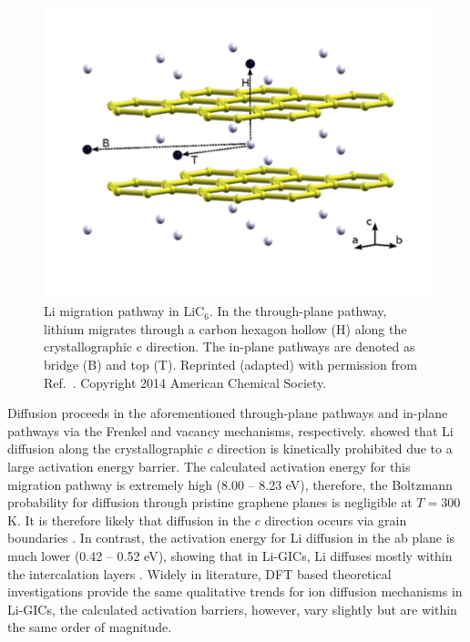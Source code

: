 \documentclass[../main.tex]{subfiles}
\begin{document}
\begin{figure}
    \centering           
    \includegraphics[scale=0.8]{figures/Islam-Fig-LiC6.png}
    \caption{Li migration pathway in LiC$_{6}$. In the through-plane pathway, lithium migrates through a carbon hexagon hollow (H) along the crystallographic c direction. The in-plane pathways are denoted as bridge (B) and top (T). Reprinted (adapted) with permission from Ref.~. Copyright 2014 American Chemical Society.}
    \label{fig:Rl}
\end{figure}
        

 Diffusion proceeds in the aforementioned through-plane pathways and in-plane pathways via the Frenkel and vacancy mechanisms, respectively. \citeauthor{thinius2014theoretical} showed that Li diffusion along the crystallographic $c$ direction is kinetically prohibited due to a large activation energy barrier. \cite{thinius2014theoretical} The calculated activation energy for this migration pathway is extremely high (8.00 -- 8.23 eV), therefore, the Boltzmann probability for diffusion through pristine graphene planes is negligible at $T=300$ K. It is therefore likely that diffusion in the $c$ direction occurs via grain boundaries \cite{persson2010lithium}. In contrast, the activation energy for Li diffusion in the ab plane is much lower (0.42 -- 0.52 eV), showing that in Li-GICs, Li diffuses mostly within the intercalation layers \cite{thinius2014theoretical}. Widely in literature, DFT based theoretical investigations provide the same qualitative trends for ion diffusion mechanisms in Li-GICs, the calculated activation barriers, however, vary slightly but are within the same order of magnitude. \cite{Imai-JAC-2007,persson2010lithium,toyoura2010effects,Wang} 
\end{document}
